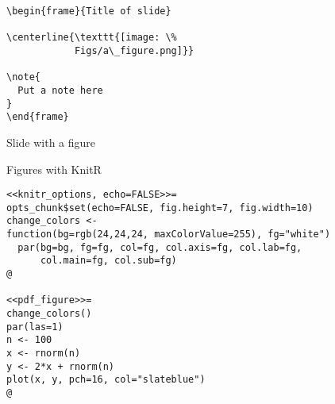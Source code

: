 \documentclass[12pt,t]{beamer}
\begin{document}
\newsavebox{\codeboxfour}
\begin{lrbox}{\codeboxfour}
\begin{lstlisting}
\begin{frame}{Title of slide}

\centerline{\texttt{[image: \%
            Figs/a\_figure.png]}}

\note{
  Put a note here
}
\end{frame}
\end{lstlisting}
\end{lrbox}


\begin{frame}[c,fragile]{Slide with a figure}
\addtocounter{framenumber}{-1}

\usebox{\codeboxfour}

\end{frame}



\begin{frame}[c,fragile]{Figures with KnitR}

\begin{lstlisting}
<<knitr_options, echo=FALSE>>=
opts_chunk$set(echo=FALSE, fig.height=7, fig.width=10)
change_colors <-
function(bg=rgb(24,24,24, maxColorValue=255), fg="white")
  par(bg=bg, fg=fg, col=fg, col.axis=fg, col.lab=fg,
      col.main=fg, col.sub=fg)
@

<<pdf_figure>>=
change_colors()
par(las=1)
n <- 100
x <- rnorm(n)
y <- 2*x + rnorm(n)
plot(x, y, pch=16, col="slateblue")
@
\end{lstlisting}

\end{frame}
\end{document}
